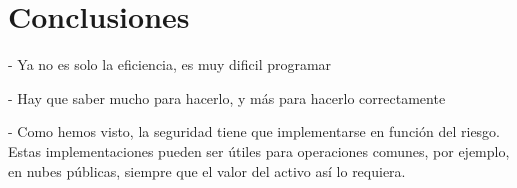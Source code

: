 \chapter{Conclusiones}
\label{chap:conclusiones}

- Ya no es solo la eficiencia, es muy dificil programar

- Hay que saber mucho para hacerlo, y más para hacerlo correctamente \cite{peng_danger_2019}

- Como hemos visto, la seguridad tiene que implementarse en función del riesgo. Estas implementaciones pueden ser útiles para operaciones comunes, por ejemplo, en nubes públicas, siempre que el valor del activo así lo requiera.